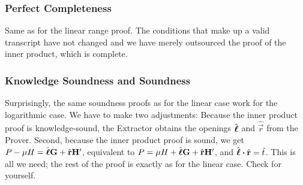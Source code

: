\subsubsection{Perfect Completeness}

Same as for the linear range proof.
The conditions that make up a valid transcript have not changed
and we have merely outsourced the proof of the inner product,
which is complete.

\subsubsection{Knowledge Soundness and Soundness}

Surprisingly,
the same soundness proofs as for the linear case work for the logarithmic case.
%
We have to make two adjustments:
Because the inner product proof is knowledge-sound,
the Extractor obtains the openings $\hat{\mathbf{\boldsymbol{\ell}}}$ and $\hat{\vec{r}}$ from the Prover.
Second,
because the inner product proof is sound,
we get $P - \mu H = \hat{\mathbf{\boldsymbol{\ell}}}\mathbf{G} + \hat{\mathbf{r}}\mathbf{H}'$,
equivalent to $P = \mu H + \hat{\mathbf{\boldsymbol{\ell}}}\mathbf{G} + \hat{\mathbf{r}}\mathbf{H}'$,
and $\hat{\mathbf{\boldsymbol{\ell}}} \boldsymbol{\cdot} \hat{\mathbf{r}} = \hat{t}$.
%
This is all we need;
the rest of the proof is exactly as for the linear case.
Check for yourself.
